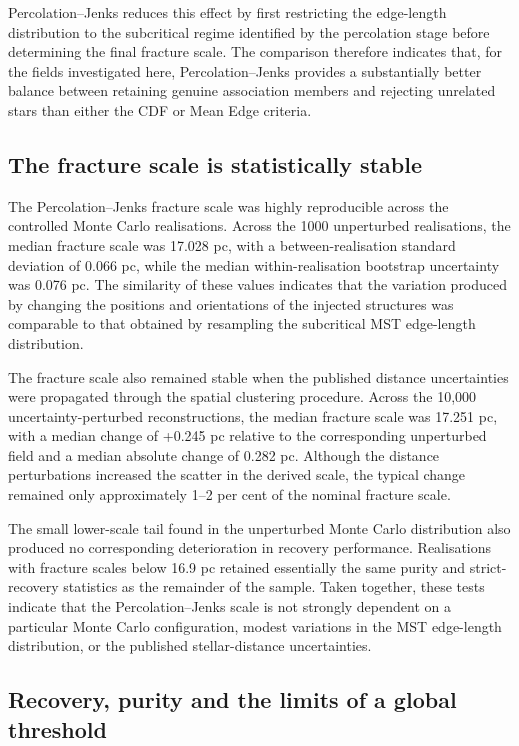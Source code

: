 \documentclass[fleqn,usenatbib]{mnras}
\begin{document}
Percolation--Jenks reduces this effect by first restricting the edge-length distribution to the subcritical regime identified by the percolation stage before determining the final fracture scale. The comparison therefore indicates that, for the fields investigated here, Percolation--Jenks provides a substantially better balance between retaining genuine association members and rejecting unrelated stars than either the CDF or Mean Edge criteria.

\subsection{The fracture scale is statistically stable}

The Percolation–Jenks fracture scale was highly reproducible across the controlled Monte Carlo realisations. Across the 1000 unperturbed realisations, the median fracture scale was 17.028 pc, with a between-realisation standard deviation of 0.066 pc, while the median within-realisation bootstrap uncertainty was 0.076 pc. The similarity of these values indicates that the variation produced by changing the positions and orientations of the injected structures was comparable to that obtained by resampling the subcritical MST edge-length distribution.

The fracture scale also remained stable when the published distance uncertainties were propagated through the spatial clustering procedure. Across the 10,000 uncertainty-perturbed reconstructions, the median fracture scale was 17.251 pc, with a median change of +0.245 pc relative to the corresponding unperturbed field and a median absolute change of 0.282 pc. Although the distance perturbations increased the scatter in the derived scale, the typical change remained only approximately 1–2 per cent of the nominal fracture scale.


The small lower-scale tail found in the unperturbed Monte Carlo distribution also produced no corresponding deterioration in recovery performance. Realisations with fracture scales below 16.9 pc retained essentially the same purity and strict-recovery statistics as the remainder of the sample. Taken together, these tests indicate that the Percolation–Jenks scale is not strongly dependent on a particular Monte Carlo configuration, modest variations in the MST edge-length distribution, or the published stellar-distance uncertainties.
 

\subsection{Recovery, purity and the limits of a global threshold}
\end{document}
